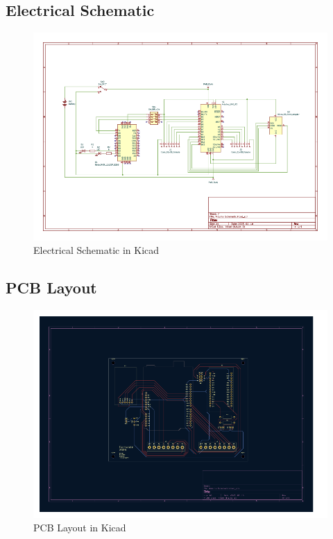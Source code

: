 \documentclass[12pt, titlepage]{article}
\begin{document}
\subsection{Electrical Schematic}
\begin{figure}[h!]
  \begin{center}
  \includegraphics[width=1.1\textwidth]{Electrical_Schematic}
  \caption{Electrical Schematic in Kicad}
  \end{center}
  \end{figure}
  \newpage

\subsection{PCB Layout}
\begin{figure}[h!]
  \begin{center}
  \includegraphics[width=1.1\textwidth]{PCB_Schematic}
  \caption{PCB Layout in Kicad}
  \end{center}
  \end{figure}
  \newpage
\end{document}
